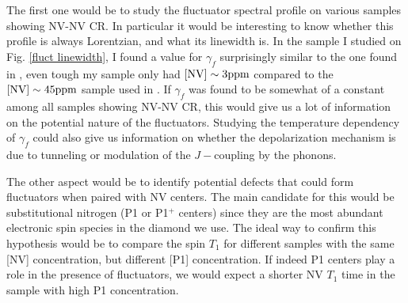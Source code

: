 \documentclass[a4paper,11pt]{report}
\begin{document}
The first one would be to study the fluctuator spectral profile on various samples showing NV-NV CR. In particular it would be interesting to know whether this profile is always Lorentzian, and what its linewidth is. In the sample I studied on Fig. \ref{fluct linewidth}, I found a value for $\gamma_f$ surprisingly similar to the one found in \citep{choi2017depolarization}, even tough my sample only had $[\rm NV] \sim 3 ppm$ compared to the $[\rm NV] \sim 45 ppm$ sample used in \citep{choi2017depolarization}. If $\gamma_f$ was found to be somewhat of a constant among all samples showing NV-NV CR, this would give us a lot of information on the potential nature of the fluctuators. Studying the temperature dependency of $\gamma_f$ could also give us information on whether the depolarization mechanism is due to tunneling or modulation of the $J-$coupling by the phonons.

The other aspect would be to identify potential defects that could form fluctuators when paired with NV centers. The main candidate for this would be substitutional nitrogen (P1 or P1$^+$ centers) since they are the most abundant electronic spin species in the diamond we use. The ideal way to confirm this hypothesis would be to compare the spin $T_1$ for  different samples with the same [NV] concentration, but different [P1] concentration. If indeed P1 centers play a role in the presence of fluctuators, we would expect a shorter NV $T_1$ time in the sample with high P1 concentration.


\printbibliography
\end{document}
